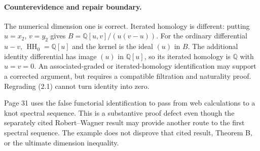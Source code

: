 \documentclass[10pt]{article}
\begin{document}
\paragraph*{Counterevidence and repair boundary.}\mbox{}\par
The numerical dimension one is correct. Iterated homology is different: putting \(u=x_2\), \(v=y_2\) gives \(B=\mathbb Q[u,v]/(u(v-u))\). For the ordinary differential \(u-v\), \(\operatorname{HH}_0=\mathbb Q[u]\) and the kernel is the ideal \((u)\) in \(B\). The additional identity differential has image \((u)\) in \(\mathbb Q[u]\), so its iterated homology is \(\mathbb Q\) with \(u=v=0\). An associated-graded or iterated-homology identification may support a corrected argument, but requires a compatible filtration and naturality proof. Regrading (2.1) cannot turn identity into zero.\par
Page 31 uses the false functorial identification to pass from web calculations to a knot spectral sequence. This is a substantive proof defect even though the separately cited Robert–Wagner result may provide another route to the first spectral sequence. The example does not disprove that cited result, Theorem B, or the ultimate dimension inequality.\par
\end{document}
